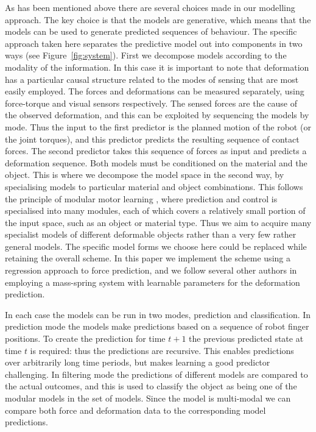 \documentclass[journal]{IEEEtran}
\begin{document}
As has been mentioned above there are several choices made in our modelling approach. The key choice is that the models are generative, which means that the models can be used to generate predicted sequences of behaviour. The specific approach taken here separates the predictive model out into components in two ways (see Figure~\ref{fig:system}). First we decompose models according to the modality of the information. In this case it is important to note that deformation has a particular causal structure related to the modes of sensing that are most easily employed. The forces and deformations can be measured separately, using force-torque and visual sensors respectively. The sensed forces are the cause of the observed deformation, and this can be exploited by sequencing the models by mode. Thus the input to the first predictor is the planned motion of the robot (or the joint torques), and this predictor predicts the resulting sequence of contact forces. The second predictor takes this sequence of forces as input and predicts a deformation sequence. Both models must be conditioned on the material and the object. This is where we decompose the model space in the second way, by specialising models to particular material and object combinations. This follows the principle of modular motor learning \cite{KopickiICRA11,haruno2001mosaic}, where prediction and control is specialised into many modules, each of which covers a relatively small portion of the input space, such as an object or material type. Thus we aim to acquire many specialist models of different deformable objects rather than a very few rather general models. The specific model forms we choose here could be replaced while retaining the overall scheme. In this paper we implement the scheme using a regression approach to force prediction, and we follow several other authors in employing a mass-spring system with learnable parameters for the deformation prediction.

In each case the models can be run in two modes, prediction and classification. In prediction mode the models make predictions based on a sequence of robot finger positions. To create the prediction for time $t+1$ the previous predicted state at time $t$ is required: thus the predictions are recursive. This enables predictions over arbitrarily long time periods, but makes learning a good predictor challenging. In filtering mode the predictions of different models are compared to the actual outcomes, and this is used to classify the object as being one of the modular models in the set of models. Since the model is multi-modal we can compare both force and deformation data to the corresponding model predictions. 
\end{document}
